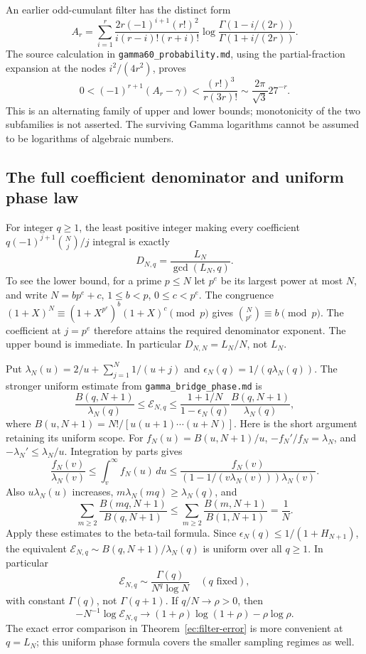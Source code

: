 \documentclass[11pt,a4paper]{article}
\theoremstyle{definition}
\theoremstyle{remark}
\numberwithin{equation}{section}
\begin{document}
An earlier odd-cumulant filter has the distinct form
\[
 A_r=\sum_{i=1}^r
 \frac{2r(-1)^{i+1}(r!)^2}{i(r-i)!(r+i)!}
 \log\frac{\Gamma(1-i/(2r))}{\Gamma(1+i/(2r))}.
\]
The source calculation in \texttt{gamma60\_probability.md}, using the
partial-fraction expansion at the nodes $i^2/(4r^2)$, proves
\[
 0<(-1)^{r+1}(A_r-\gamma)
 <\frac{(r!)^3}{r(3r)!}\sim\frac{2\pi}{\sqrt3}27^{-r}.
\]
This is an alternating family of upper and lower bounds; monotonicity of
the two subfamilies is not asserted.  The surviving Gamma logarithms
cannot be assumed to be logarithms of algebraic numbers.

\subsection{The full coefficient denominator and uniform phase law}
\label{ec:phase}
For integer $q\ge1$, the least positive integer making every coefficient
$q(-1)^{j+1}\binom Nj/j$ integral is exactly
\[
 D_{N,q}=\frac{L_N}{\gcd(L_N,q)}.
\]
To see the lower bound, for a prime $p\le N$ let $p^e$ be its largest
power at most $N$, and write $N=bp^e+c$, $1\le b<p$, $0\le c<p^e$.
The congruence $(1+X)^N\equiv(1+X^{p^e})^b(1+X)^c\pmod p$
gives $\binom N{p^e}\equiv b\pmod p$.  The coefficient at $j=p^e$
therefore attains the required denominator exponent.  The upper bound
is immediate.  In particular $D_{N,N}=L_N/N$, not $L_N$.

Put $\lambda_N(u)=2/u+\sum_{j=1}^N1/(u+j)$ and
$\epsilon_N(q)=1/(q\lambda_N(q))$.  The stronger uniform estimate
from \texttt{gamma\_bridge\_phase.md} is
\[
 \frac{B(q,N+1)}{\lambda_N(q)}\le\mathcal E_{N,q}
 \le\frac{1+1/N}{1-\epsilon_N(q)}
       \frac{B(q,N+1)}{\lambda_N(q)},
\]
where $B(u,N+1)=N!/[u(u+1)\cdots(u+N)]$.  Here is the short argument
retaining its uniform scope.  For $f_N(u)=B(u,N+1)/u$,
$-f_N'/f_N=\lambda_N$, and
$-\lambda_N'\le\lambda_N/u$.  Integration by parts gives
\[
 \frac{f_N(v)}{\lambda_N(v)}\le\int_v^\infty f_N(u)\,du
 \le\frac{f_N(v)}{(1-1/(v\lambda_N(v)))\lambda_N(v)}.
\]
Also $u\lambda_N(u)$ increases,
$m\lambda_N(mq)\ge\lambda_N(q)$, and
\[
 \sum_{m\ge2}\frac{B(mq,N+1)}{B(q,N+1)}
 \le\sum_{m\ge2}\frac{B(m,N+1)}{B(1,N+1)}=\frac1N.
\]
Apply these estimates to the beta-tail formula.
Since $\epsilon_N(q)\le1/(1+H_{N+1})$, the equivalent
$\mathcal E_{N,q}\sim B(q,N+1)/\lambda_N(q)$ is uniform over
all $q\ge1$.  In particular
\[
 \mathcal E_{N,q}\sim\frac{\Gamma(q)}{N^q\log N}
 \quad(q\text{ fixed}),
\]
with constant $\Gamma(q)$, not $\Gamma(q+1)$.  If $q/N\to\rho>0$,
then
\[
 -N^{-1}\log\mathcal E_{N,q}\to
 (1+\rho)\log(1+\rho)-\rho\log\rho.
\]
The exact error comparison in Theorem~\ref{ec:filter-error} is more
convenient at $q=L_N$; this uniform phase formula covers the smaller
sampling regimes as well.
\end{document}
